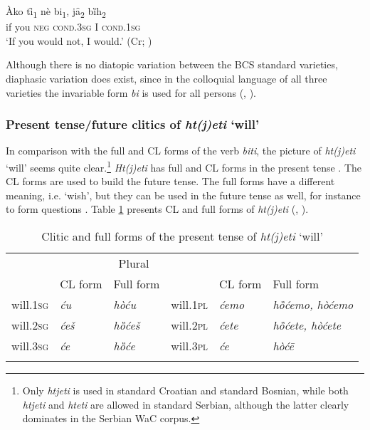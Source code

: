 \begin{exe}
\ex\label{(6.1)}
\gll Àko tȋ\textsubscript{1} nè bi\textsubscript{1}, jȃ\textsubscript{2} bȉh\textsubscript{2}\\
 if you \textsc{neg} \textsc{cond.3sg} I \textsc{cond.1sg}\\
\glt ‘If you would not, I would.’
\hfill (Cr; \citealt[72]{Baric97})
\end{exe}

\noindent Although there is no diatopic variation between the BCS standard varieties, diaphasic variation does exist, since in the colloquial language of all three varieties the invariable form \textit{bi} is used for all persons (\citealt[cf.][106]{FHM06}, \citealt[159]{MrazovicVukadinovic09}). 

\subsubsection{Present tense/future clitics of \textit{ht(j)eti} `will'}

In comparison with the full and CL forms of the verb \textit{biti}, the picture of \textit{ht(j)eti} `will' seems quite clear.\footnote{Only \textit{htjeti} is used in standard Croatian and standard Bosnian, while both \textit{htjeti} and \textit{hteti} are allowed in standard Serbian, although the latter clearly dominates in the Serbian WaC corpus.} \textit{Ht(j)eti} has full and CL forms in the present tense \citep[199]{PiperKlajn14}. The CL forms are used to build the future tense. The full forms have a different meaning, i.e. `wish', but they can be used in the future tense as well, for instance to form questions \citep[199]{PiperKlajn14}. Table \ref{table:clhtjeti} presents CL and full forms of \textit{ht(j)eti} (\citealt[cf.][272]{Baric97}, \citealt[125]{MrazovicVukadinovic09}).


\begin{table}
\caption{Clitic and full forms of the present tense of \textit{ht(j)eti} `will'\label{table:clhtjeti}}
\begin{tabular}{llllll}
\lsptoprule
\multicolumn{3}{c}{Singular} & \multicolumn{3}{c}{Plural} \\\cmidrule(lr){1-3}\cmidrule(lr){4-6}
&CL form & Full form && CL form & Full form\\\midrule
will.\textsc{1sg}	&\textit{ću}		&\textit{hòću}		&will.\textsc{1pl}	&\textit{ćemo}	&\textit{hȍćemo, hòćemo}	\\
will.\textsc{2sg}	&\textit{ćeš}		&\textit{hȍćeš}		&will.\textsc{2pl}	&\textit{ćete}	&\textit{hȍćete, hòćete}	\\
will.\textsc{3sg}	&\textit{će}		&\textit{hȍće}		&will.\textsc{3pl}	&\textit{će}		&\textit{hòćē}		\\
\lspbottomrule
\end{tabular}
\end{table}


